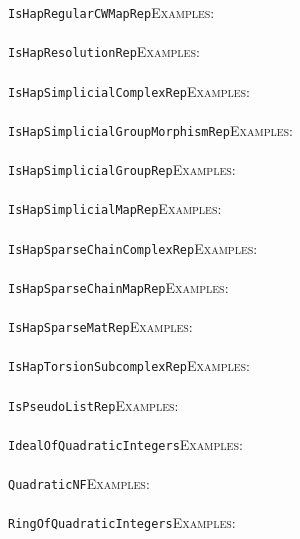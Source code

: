 \documentclass[a4paper,11pt]{report}
\begin{document}
{{ \texttt{IsHapRegularCWMapRep}{\nobreakspace}{\nobreakspace}{\nobreakspace}{\nobreakspace}\textsc{Examples:} \\
 \\
 \texttt{IsHapResolutionRep}{\nobreakspace}{\nobreakspace}{\nobreakspace}{\nobreakspace}\textsc{Examples:} \\
 \\
 \texttt{IsHapSimplicialComplexRep}{\nobreakspace}{\nobreakspace}{\nobreakspace}{\nobreakspace}\textsc{Examples:} \\
 \\
 \texttt{IsHapSimplicialGroupMorphismRep}{\nobreakspace}{\nobreakspace}{\nobreakspace}{\nobreakspace}\textsc{Examples:} \\
 \\
 \texttt{IsHapSimplicialGroupRep}{\nobreakspace}{\nobreakspace}{\nobreakspace}{\nobreakspace}\textsc{Examples:} \\
 \\
 \texttt{IsHapSimplicialMapRep}{\nobreakspace}{\nobreakspace}{\nobreakspace}{\nobreakspace}\textsc{Examples:} \\
 \\
 \texttt{IsHapSparseChainComplexRep}{\nobreakspace}{\nobreakspace}{\nobreakspace}{\nobreakspace}\textsc{Examples:} \\
 \\
 \texttt{IsHapSparseChainMapRep}{\nobreakspace}{\nobreakspace}{\nobreakspace}{\nobreakspace}\textsc{Examples:} \\
 \\
 \texttt{IsHapSparseMatRep}{\nobreakspace}{\nobreakspace}{\nobreakspace}{\nobreakspace}\textsc{Examples:} \\
 \\
 \texttt{IsHapTorsionSubcomplexRep}{\nobreakspace}{\nobreakspace}{\nobreakspace}{\nobreakspace}\textsc{Examples:} \\
 \\
 \texttt{IsPseudoListRep}{\nobreakspace}{\nobreakspace}{\nobreakspace}{\nobreakspace}\textsc{Examples:} \\
 \\
 \texttt{IdealOfQuadraticIntegers}{\nobreakspace}{\nobreakspace}{\nobreakspace}{\nobreakspace}\textsc{Examples:} \\
 \\
 \texttt{QuadraticNF}{\nobreakspace}{\nobreakspace}{\nobreakspace}{\nobreakspace}\textsc{Examples:} \\
 \\
 \texttt{RingOfQuadraticIntegers}{\nobreakspace}{\nobreakspace}{\nobreakspace}{\nobreakspace}\textsc{Examples:} \\
}}
\end{document}
